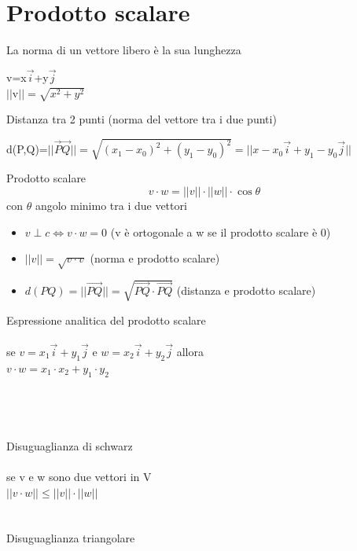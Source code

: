 \documentclass{article}
\begin{document}
\section{Prodotto scalare}

La norma di un vettore libero è la sua lunghezza
\begin{center}
v=x\(\vec{i}\)+y\(\vec{j}\)\\
\(\lvert\lvert\)v\(\rvert\rvert=\sqrt{x^2+y^2}\)
\end{center}
Distanza tra 2 punti (norma del vettore tra i due punti)
\begin{center}
    d(P,Q)=\(\lvert\lvert\vec{P}\vec{Q}\rvert\rvert=\sqrt{(x_1-x_0)^2+(y_1-y_0)^2}=\lvert\lvert x-x_0\vec{i}+y_1-y_0\vec{j}\rvert\rvert\)
\end{center}
\begin{center}
{\Large Prodotto scalare}
\[v\cdot w=\lvert\lvert v \rvert\rvert \cdot \lvert\lvert w \rvert\rvert \cdot \cos\theta\]
con \(\theta\) angolo minimo tra i due vettori
\end{center}
\begin{itemize}
    \item \(v\perp c \Leftrightarrow v \cdot w = 0\) (v è ortogonale a w se il prodotto scalare è 0)
    \item \(\lvert\lvert v \rvert\rvert = \sqrt{v \cdot v}\) (norma e prodotto scalare)
    \item \(d(PQ) = \lvert\lvert \vec{PQ}\rvert\rvert = \sqrt{\vec{PQ} \cdot \vec{PQ}}\) (distanza e prodotto scalare)
\end{itemize}
Espressione analitica del prodotto scalare\\\\
se \(v=x_1\vec{i} + y_1\vec{j}\) e \(w=x_2\vec{i} + y_2\vec{j}\) allora\\ 
\(v \cdot w = x_1 \cdot x_2 + y_1 \cdot y_2\)\\\\\\\\\\
Disuguaglianza di schwarz\\\\
se v e w sono due vettori in V\\
\(\lvert\lvert v \cdot w \rvert\rvert \leq \lvert\lvert v \rvert\rvert \cdot \lvert\lvert w \rvert\rvert\)\\\\\\ 
Disuguaglianza triangolare\\\\
\end{document}
